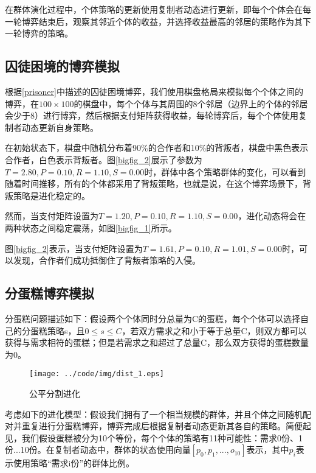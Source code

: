 \documentclass[twocolumn]{article}
\begin{document}
    在群体演化过程中，个体策略的更新使用复制者动态进行更新，即每个个体会在每一轮博弈结束后，观察其邻近个体的收益，并选择收益最高的邻居的策略作为其下一轮博弈的策略。

    \subsection{囚徒困境的博弈模拟}
    根据\ref{prisoner}中描述的囚徒困境博弈，我们使用棋盘格局来模拟每个个体之间的博弈，在$100\times 100$的棋盘中，每个个体与其周围的8个邻居（边界上的个体的邻居会少于8）进行博弈，然后根据支付矩阵获得收益，每轮博弈后，每个个体使用复制者动态更新自身策略。

     

    在初始状态下，棋盘中随机分布着90\%的合作者和10\%的背叛者，棋盘中黑色表示合作者，白色表示背叛者。图\ref{bigfig_2}展示了参数为$T=2.80, P=0.10, R=1.10, S=0.00$时，群体中各个策略群体的变化，可以看到随着时间推移，所有的个体都采用了背叛策略，也就是说，在这个博弈场景下，背叛策略是进化稳定的。

     

    然而，当支付矩阵设置为$T=1.20, P=0.10, R=1.10, S=0.00$，进化动态将会在两种状态之间稳定震荡，如图\ref{bigfig_1}所示。

    

    图\ref{bigfig_2}表示，当支付矩阵设置为$T=1.61, P=0.10, R=1.01, S=0.00$时，可以发现，合作者们成功抵御住了背叛者策略的入侵。

    \subsection{分蛋糕博弈模拟}
    分蛋糕问题描述如下：假设两个个体同时分总量为C的蛋糕，每个个体可以选择自己的分蛋糕策略s，且$0\leq s \leq C$，若双方需求之和小于等于总量C，则双方都可以获得与需求相符的蛋糕；但是若需求之和超过了总量C，那么双方获得的蛋糕数量为0。

    \begin{figure}\centering
        \texttt{[image: ../code/img/dist\_1.eps]}
        \caption{公平分割进化}
        \label{divide-1}
    \end{figure}

    考虑如下的进化模型：假设我们拥有了一个相当规模的群体，并且个体之间随机配对并重复进行分蛋糕博弈，博弈完成后根据复制者动态更新其各自的策略。简便起见，我们假设蛋糕被分为10个等份，每个个体的策略有11种可能性：需求0份、1份...10份。在复制者动态中，群体的状态使用向量$[p_0, p_1, ..., o_10]$表示，其中$p_i$表示使用策略“需求i份”的群体比例。
\end{document}
